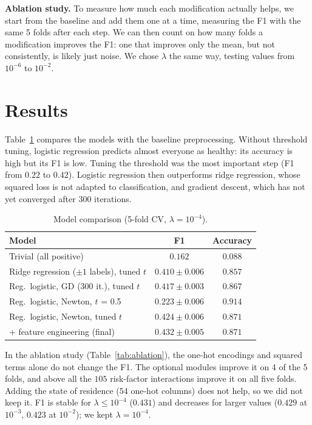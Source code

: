 \documentclass[10pt,conference,compsocconf]{IEEEtran}
\begin{document}
\textbf{Ablation study.} To measure how much each modification actually helps, we
start from the baseline and add them one at a time, measuring the F1 with the same 5
folds after each step. We can then count on how many folds a modification improves the
F1: one that improves only the mean, but not consistently, is likely just noise. We
chose $\lambda$ the same way, testing values from $10^{-6}$ to $10^{-2}$.

\section{Results}
\label{sec:results}
Table~\ref{tab:models} compares the models with the baseline preprocessing. Without
threshold tuning, logistic regression predicts almost everyone as healthy: its accuracy
is high but its F1 is low. Tuning the threshold was the most important step
(F1 from $0.22$ to $0.42$). Logistic regression then outperforms ridge regression,
whose squared loss is not adapted to classification, and gradient descent, which has
not yet converged after 300 iterations.

\begin{table}[htbp]
  \centering
  \caption{Model comparison (5-fold CV, $\lambda = 10^{-4}$).}
  \label{tab:models}
  \footnotesize\setlength{\tabcolsep}{3pt}
  \begin{tabular}{lcc}
    \toprule
    Model & F1 & Accuracy \\
    \midrule
    Trivial (all positive) & $0.162$ & $0.088$ \\
    Ridge regression ($\pm1$ labels), tuned $t$ & $0.410 \pm 0.006$ & $0.857$ \\
    Reg.\ logistic, GD (300 it.), tuned $t$ & $0.417 \pm 0.003$ & $0.867$ \\
    Reg.\ logistic, Newton, $t$ = 0.5 & $0.223 \pm 0.006$ & $0.914$ \\
    Reg.\ logistic, Newton, tuned $t$ & $0.424 \pm 0.006$ & $0.871$ \\
    \midrule
    + feature engineering (final) & $\mathbf{0.432 \pm 0.005}$ & $0.871$ \\
    \bottomrule
  \end{tabular}
\end{table}

In the ablation study (Table~\ref{tab:ablation}), the one-hot encodings and squared
terms alone do not change the F1. The optional modules improve it on 4 of the 5 folds,
and above all the $105$ risk-factor interactions improve it on all five folds. Adding
the state of residence ($54$ one-hot columns) does not help, so we did not keep it. F1
is stable for $\lambda \le 10^{-4}$ ($0.431$) and decreases for larger values ($0.429$
at $10^{-3}$, $0.423$ at $10^{-2}$); we kept $\lambda = 10^{-4}$.
\end{document}
